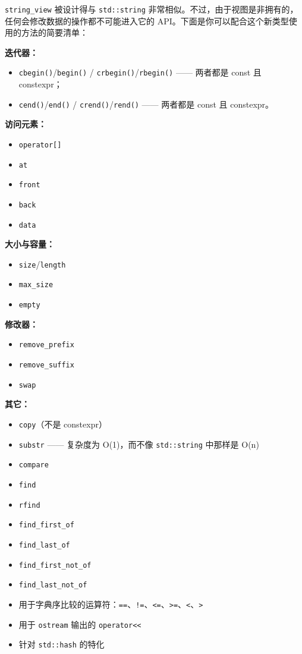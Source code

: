 \texttt{string\_view} 被设计得与 \texttt{std::string} 非常相似。不过，由于视图是非拥有的，任何会修改数据的操作都不可能进入它的 API。下面是你可以配合这个新类型使用的方法的简要清单：

\textbf{迭代器：}

\begin{itemize}
\item \texttt{cbegin()}/\texttt{begin()} / \texttt{crbegin()}/\texttt{rbegin()} —— 两者都是 const 且 constexpr；
\item \texttt{cend()}/\texttt{end()} / \texttt{crend()}/\texttt{rend()} —— 两者都是 const 且 constexpr。
\end{itemize}

\textbf{访问元素：}

\begin{itemize}
\item \texttt{operator[]}
\item \texttt{at}
\item \texttt{front}
\item \texttt{back}
\item \texttt{data}
\end{itemize}

\textbf{大小与容量：}

\begin{itemize}
\item \texttt{size}/\texttt{length}
\item \texttt{max\_size}
\item \texttt{empty}
\end{itemize}

\textbf{修改器：}

\begin{itemize}
\item \texttt{remove\_prefix}
\item \texttt{remove\_suffix}
\item \texttt{swap}
\end{itemize}

\textbf{其它：}

\begin{itemize}
\item \texttt{copy}（不是 constexpr）
\item \texttt{substr} —— 复杂度为 O(1)，而不像 \texttt{std::string} 中那样是 O(n)
\item \texttt{compare}
\item \texttt{find}
\item \texttt{rfind}
\item \texttt{find\_first\_of}
\item \texttt{find\_last\_of}
\item \texttt{find\_first\_not\_of}
\item \texttt{find\_last\_not\_of}
\item 用于字典序比较的运算符：\texttt{==}、\texttt{!=}、\texttt{<=}、\texttt{>=}、\texttt{<}、\texttt{>}
\item 用于 \texttt{ostream} 输出的 \texttt{operator<<}
\item 针对 \texttt{std::hash} 的特化
\end{itemize}

